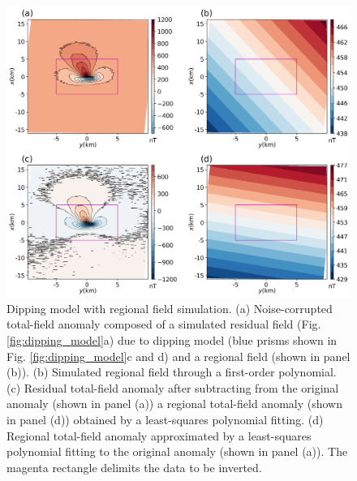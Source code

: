 \begin{figure}
    \centering
    \includegraphics[width=\linewidth]{figures/regional-data-large.png}
    \caption{Dipping model with regional field simulation. (a) Noise-corrupted total-field anomaly composed of a simulated residual field (Fig. \ref{fig:dipping_model}a) due to 
dipping model (blue prisms shown in Fig. \ref{fig:dipping_model}c and d) and a regional field (shown in panel (b)). (b) Simulated regional field through a first-order polynomial. 
(c) Residual total-field anomaly after subtracting from the original anomaly (shown in panel (a)) a
regional total-field anomaly (shown in panel (d)) obtained by a least-squares polynomial fitting. 
(d)  Regional total-field anomaly approximated by a least-squares polynomial fitting to the original anomaly (shown in panel (a)). The magenta rectangle delimits the data to be inverted.
}
    \label{fig:dipping_regional_model}
\end{figure}

